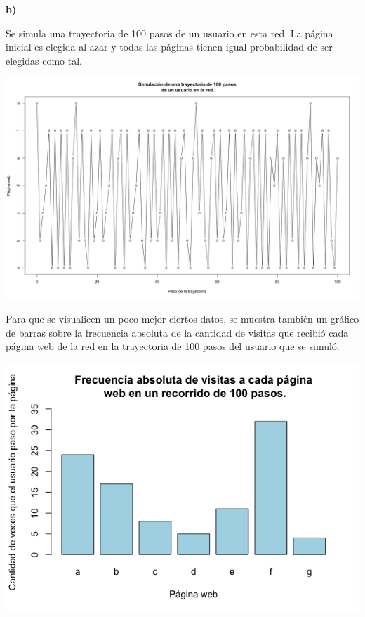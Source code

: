 \documentclass[11pt]{article}
\begin{document}
\textbf{b)}

Se simula una trayectoria de 100 pasos de un usuario en esta red. La página inicial es elegida al azar y todas las páginas tienen igual probabilidad de ser elegidas como tal.

\hspace{-3.6cm}\includegraphics[scale = 0.4]{trayectoriaredEJ5.png}

Para que se visualicen un poco mejor ciertos datos, se muestra también un gráfico de barras sobre la frecuencia absoluta de la cantidad de visitas que recibió cada página web de la red en la trayectoria de 100 pasos del usuario que se simuló.

\begin{center}\includegraphics[scale = 0.5]{frecabsEJ5.png}\end{center}

\end{document}
